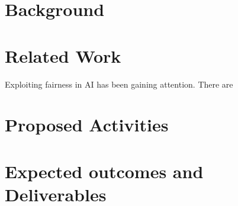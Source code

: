 \documentclass[11pt]{article}
\begin{document}
\section{Background}


\section{Related Work}
Exploiting fairness in AI has been gaining attention. There are 

\section{Proposed Activities}

\section{Expected outcomes and Deliverables}
 

 
\end{document}
